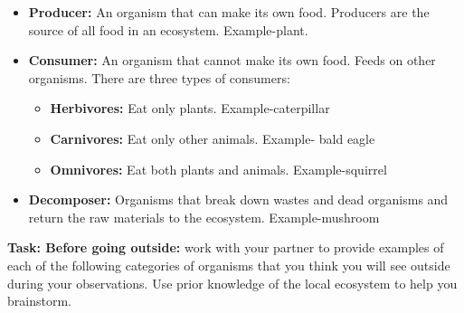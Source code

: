 \documentclass[11pt]{sig-alternate}
\begin{document}
\begin{large}
\begin{itemize}
    \item \textbf{Producer:} An organism that can make its own food. Producers are the source of all food in an ecosystem. Example-plant.
    \item \textbf{Consumer:} An organism that cannot make its own food. Feeds on other organisms. There are three types of consumers:
    \begin{itemize}
        \item \textbf{Herbivores:} Eat only plants. Example-caterpillar
        \item \textbf{Carnivores:} Eat only other animals. Example- bald eagle
        \item \textbf{Omnivores:} Eat both plants and animals. Example-squirrel
    \end{itemize}
    \item \textbf{Decomposer:} Organisms that break down wastes and dead organisms and return the raw materials to the ecosystem. Example-mushroom
\end{itemize}

\textbf{Task: Before going outside:} work with your partner to provide examples of each of the following categories of organisms that you think you will see outside during your observations. Use prior knowledge of the local ecosystem to help you brainstorm.

\begin{table}[h!]
\end{table}


\end{large}
\end{document}
